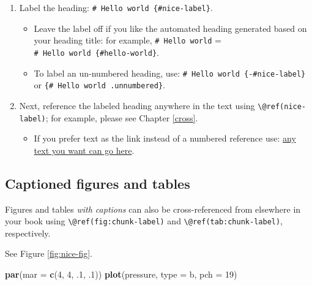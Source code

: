 \documentclass[
]{book}
\newenvironment{Shaded}{\begin{snugshade}}{\end{snugshade}}
\newcommand{\AttributeTok}[1]{\textcolor[rgb]{0.13,0.29,0.53}{#1}}
\newcommand{\DecValTok}[1]{\textcolor[rgb]{0.00,0.00,0.81}{#1}}
\newcommand{\FunctionTok}[1]{\textcolor[rgb]{0.13,0.29,0.53}{\textbf{#1}}}
\newcommand{\NormalTok}[1]{#1}
\newcommand{\StringTok}[1]{\textcolor[rgb]{0.31,0.60,0.02}{#1}}
\providecommand{\tightlist}{%
  \setlength{\itemsep}{0pt}\setlength{\parskip}{0pt}}
\theoremstyle{definition}
\theoremstyle{definition}
\theoremstyle{definition}
\theoremstyle{definition}
\theoremstyle{remark}
\begin{document}
\begin{enumerate}
\def\labelenumi{\arabic{enumi}.}
\tightlist
\item
  Label the heading: \texttt{\#\ Hello\ world\ \{\#nice-label\}}.

  \begin{itemize}
  \tightlist
  \item
    Leave the label off if you like the automated heading generated based on your heading title: for example, \texttt{\#\ Hello\ world} = \texttt{\#\ Hello\ world\ \{\#hello-world\}}.
  \item
    To label an un-numbered heading, use: \texttt{\#\ Hello\ world\ \{-\#nice-label\}} or \texttt{\{\#\ Hello\ world\ .unnumbered\}}.
  \end{itemize}
\item
  Next, reference the labeled heading anywhere in the text using \texttt{\textbackslash{}@ref(nice-label)}; for example, please see Chapter \ref{cross}.

  \begin{itemize}
  \tightlist
  \item
    If you prefer text as the link instead of a numbered reference use: \protect\hyperlink{cross}{any text you want can go here}.
  \end{itemize}
\end{enumerate}

\hypertarget{captioned-figures-and-tables}{%
\subsection{Captioned figures and tables}\label{captioned-figures-and-tables}}

Figures and tables \emph{with captions} can also be cross-referenced from elsewhere in your book using \texttt{\textbackslash{}@ref(fig:chunk-label)} and \texttt{\textbackslash{}@ref(tab:chunk-label)}, respectively.

See Figure \ref{fig:nice-fig}.

\begin{Shaded}
\begin{Highlighting}[]
\FunctionTok{par}\NormalTok{(}\AttributeTok{mar =} \FunctionTok{c}\NormalTok{(}\DecValTok{4}\NormalTok{, }\DecValTok{4}\NormalTok{, .}\DecValTok{1}\NormalTok{, .}\DecValTok{1}\NormalTok{))}
\FunctionTok{plot}\NormalTok{(pressure, }\AttributeTok{type =} \StringTok{\textquotesingle{}b\textquotesingle{}}\NormalTok{, }\AttributeTok{pch =} \DecValTok{19}\NormalTok{)}
\end{Highlighting}
\end{Shaded}
\end{document}
